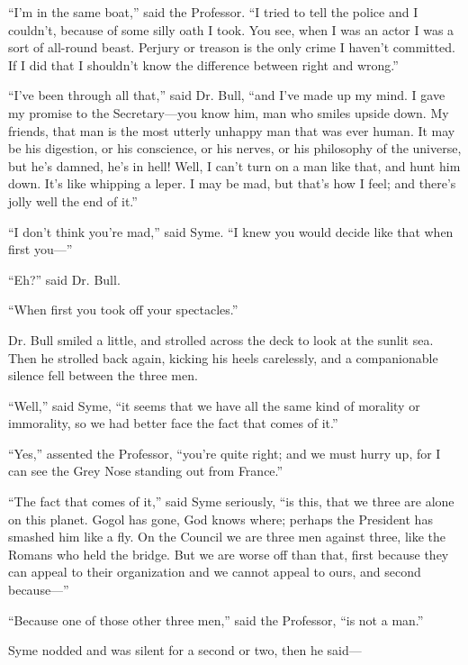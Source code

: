 “I’m in the same boat,” said the Professor. “I tried to tell the police and I couldn’t, because of some silly oath I took. You see, when I was an actor I was a sort of all-round beast. Perjury or treason is the only crime I haven’t committed. If I did that I shouldn’t know the difference between right and wrong.”

“I’ve been through all that,” said Dr. Bull, “and I’ve made up my mind. I gave my promise to the Secretary⁠—you know him, man who smiles upside down. My friends, that man is the most utterly unhappy man that was ever human. It may be his digestion, or his conscience, or his nerves, or his philosophy of the universe, but he’s damned, he’s in hell! Well, I can’t turn on a man like that, and hunt him down. It’s like whipping a leper. I may be mad, but that’s how I feel; and there’s jolly well the end of it.”

“I don’t think you’re mad,” said Syme. “I knew you would decide like that when first you⁠—”

“Eh?” said Dr. Bull.

“When first you took off your spectacles.”

Dr. Bull smiled a little, and strolled across the deck to look at the sunlit sea. Then he strolled back again, kicking his heels carelessly, and a companionable silence fell between the three men.

“Well,” said Syme, “it seems that we have all the same kind of morality or immorality, so we had better face the fact that comes of it.”

“Yes,” assented the Professor, “you’re quite right; and we must hurry up, for I can see the Grey Nose standing out from France.”

“The fact that comes of it,” said Syme seriously, “is this, that we three are alone on this planet. Gogol has gone, God knows where; perhaps the President has smashed him like a fly. On the Council we are three men against three, like the Romans who held the bridge. But we are worse off than that, first because they can appeal to their organization and we cannot appeal to ours, and second because⁠—”

“Because one of those other three men,” said the Professor, “is not a man.”

Syme nodded and was silent for a second or two, then he said⁠—

